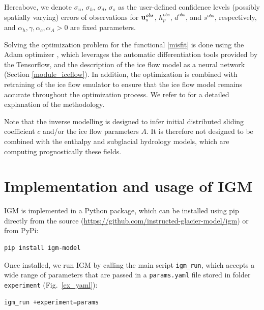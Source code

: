 \documentclass[gmd]{copernicus}
\begin{document}
Hereabove, we denote $\sigma_u$, $\sigma_h$, $\sigma_d$, $\sigma_s$ as the user-defined confidence levels (possibly spatially varying) errors of observations for ${\bf u}_s^{obs}$, $h_p^{obs}$, $d^{obs}$, and $s^{obs}$, respectively, and $\alpha_h, \gamma, \alpha_c, \alpha_A>0$ are fixed parameters.

Solving the optimization problem for the functional \eqref{misfit} is done using the Adam optimizer \citep{kingma2014adam}, which  leverages the automatic differentiation tools provided by the Tensorflow, and the description of the ice flow model as a neural network (Section \ref{module_iceflow}). In addition, the optimization is combined with retraining of the ice flow emulator to ensure that the ice flow model remains accurate throughout the optimization process. We refer to \citet{jouvet2023ice} for a detailed explanation of the methodology.
 
Note that the inverse modelling is designed to infer initial distributed sliding coefficient $c$ and/or the ice flow parameters $A$. It is therefore not designed to be combined with the enthalpy and subglacial hydrology models, which are computing prognostically these fields.
 
\section{Implementation and usage of IGM}

IGM is implemented in a Python package, which can be installed using pip directly from the source (\url{https://github.com/instructed-glacier-model/igm}) or from PyPi:
\begin{lstlisting}[language=bash,frame=single,numbers=none]
pip install igm-model
\end{lstlisting}

Once installed, we run IGM by calling the main script \texttt{igm\_run}, which accepts a wide range of parameters that are passed in a \texttt{params.yaml} file stored in folder \texttt{experiment} (Fig.~\ref{ex_yaml}):
\begin{lstlisting}[language=bash,frame=single,numbers=none]
igm_run +experiment=params
\end{lstlisting} 
\end{document}
